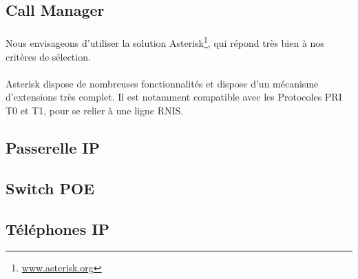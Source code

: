 \subsection{Call Manager}

\paragraph{} Nous envisageons d'utiliser la solution
Asterisk\footnote{\url{www.asterisk.org}}, qui répond très bien à nos critères
de sélection.

\paragraph{} Asterisk dispose de nombreuses fonctionnalités et dispose d'un
mécanisme d'extensions très complet. Il est notamment compatible avec les
Protocoles \ac{PRI} T0 et T1, pour se relier à une ligne \ac{RNIS}.

\subsection{Passerelle IP}
\subsection{Switch POE}
\subsection{Téléphones IP}
